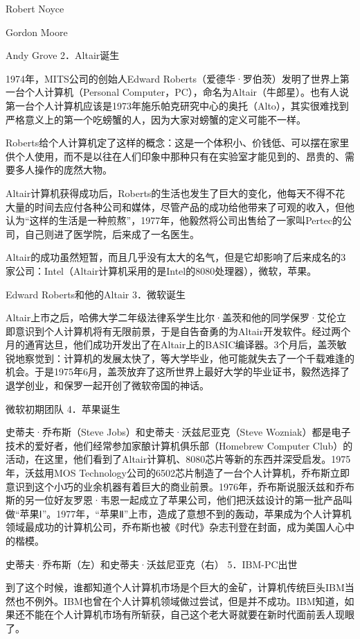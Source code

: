 \documentclass[12pt,UTF8]{ctexbook}
\begin{document}
Robert Noyce

Gordon Moore

Andy Grove
2．Altair诞生

1974年，MITS公司的创始人Edward Roberts（爱德华·罗伯茨）发明了世界上第一台个人计算机（Personal Computer，PC），命名为Altair（牛郎星）。也有人说第一台个人计算机应该是1973年施乐帕克研究中心的奥托（Alto），其实很难找到严格意义上的第一个吃螃蟹的人，因为大家对螃蟹的定义可能不一样。

Roberts给个人计算机定了这样的概念：这是一个体积小、价钱低、可以摆在家里供个人使用，而不是以往在人们印象中那种只有在实验室才能见到的、昂贵的、需要多人操作的庞然大物。

Altair计算机获得成功后，Roberts的生活也发生了巨大的变化，他每天不得不花大量的时间去应付各种公司和媒体，尽管产品的成功给他带来了可观的收入，但他认为“这样的生活是一种煎熬”，1977年，他毅然将公司出售给了一家叫Pertec的公司，自己则进了医学院，后来成了一名医生。

Altair的成功虽然短暂，而且几乎没有太大的名气，但是它却影响了后来成名的3家公司：Intel（Altair计算机采用的是Intel的8080处理器），微软，苹果。

Edward Roberts和他的Altair
3．微软诞生

Altair上市之后，哈佛大学二年级法律系学生比尔·盖茨和他的同学保罗·艾伦立即意识到个人计算机将有无限前景，于是自告奋勇的为Altair开发软件。经过两个月的通宵达旦，他们成功开发出了在Altair上的BASIC编译器。3个月后，盖茨敏锐地察觉到：计算机的发展太快了，等大学毕业，他可能就失去了一个千载难逢的机会。于是1975年6月，盖茨放弃了这所世界上最好大学的毕业证书，毅然选择了退学创业，和保罗一起开创了微软帝国的神话。

微软初期团队
4．苹果诞生

史蒂夫·乔布斯（Steve Jobs）和史蒂夫·沃兹尼亚克（Steve Wozniak）都是电子技术的爱好者，他们经常参加家酿计算机俱乐部（Homebrew Computer Club）的活动，在这里，他们看到了Altair计算机、8080芯片等新的东西并深受启发。1975年，沃兹用MOS Technology公司的6502芯片制造了一台个人计算机，乔布斯立即意识到这个小巧的业余机器有着巨大的商业前景。1976年，乔布斯说服沃兹和乔布斯的另一位好友罗恩·韦恩一起成立了苹果公司，他们把沃兹设计的第一批产品叫做“苹果Ⅰ”。1977年，“苹果Ⅱ”上市，造成了意想不到的轰动，苹果成为个人计算机领域最成功的计算机公司，乔布斯也被《时代》杂志刊登在封面，成为美国人心中的楷模。

史蒂夫·乔布斯（左）和史蒂夫·沃兹尼亚克（右）
5．IBM-PC出世

到了这个时候，谁都知道个人计算机市场是个巨大的金矿，计算机传统巨头IBM当然也不例外。IBM也曾在个人计算机领域做过尝试，但是并不成功。IBM知道，如果还不能在个人计算机市场有所斩获，自己这个老大哥就要在新时代面前丢人现眼了。
\end{document}
